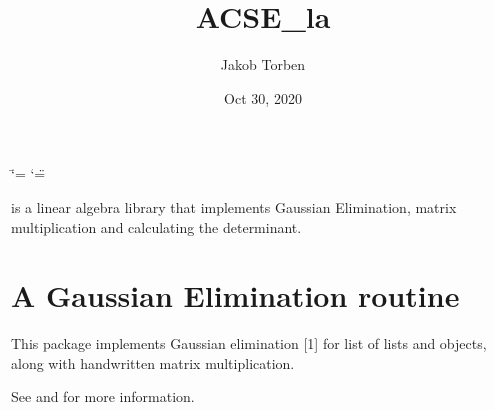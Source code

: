 \documentclass[letterpaper,10pt,english]{sphinxmanual}
\title{ACSE\_la}
\date{Oct 30, 2020}
\author{Jakob Torben}
\begin{document}
\ifdefined\shorthandoff
  \ifnum\catcode`\=\string=\active\shorthandoff{=}\fi
  \ifnum\catcode`\"=\active{}\fi
\fi

\pagestyle{empty}
\sphinxmaketitle
\pagestyle{plain}
\sphinxtableofcontents
\pagestyle{normal}
\label{\detokenize{index::doc}}


 is a linear algebra library that implements Gaussian Elimination, matrix multiplication and calculating the determinant.


\chapter{A Gaussian Elimination routine}
\label{\detokenize{index:a-gaussian-elimination-routine}}
This package implements Gaussian elimination {[}1{]} for list of lists and  objects, along with hand\sphinxhyphen{}written matrix multiplication.

See  and  for more information.
\end{document}
